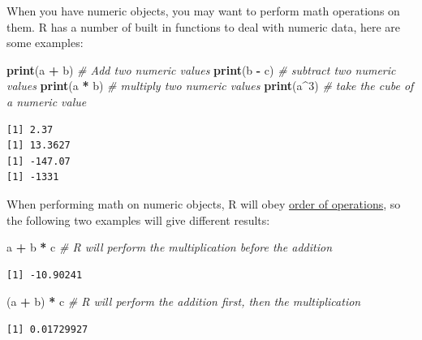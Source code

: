 \documentclass[
]{article}
\newenvironment{Shaded}{\begin{snugshade}}{\end{snugshade}}
\newcommand{\CommentTok}[1]{\textcolor[rgb]{0.56,0.35,0.01}{\textit{#1}}}
\newcommand{\DecValTok}[1]{\textcolor[rgb]{0.00,0.00,0.81}{#1}}
\newcommand{\KeywordTok}[1]{\textcolor[rgb]{0.13,0.29,0.53}{\textbf{#1}}}
\newcommand{\NormalTok}[1]{#1}
\newcommand{\OperatorTok}[1]{\textcolor[rgb]{0.81,0.36,0.00}{\textbf{#1}}}
\newcommand{\StringTok}[1]{\textcolor[rgb]{0.31,0.60,0.02}{#1}}
\begin{document}
When you have numeric objects, you may want to perform math operations on them.
R has a number of built in functions to deal with numeric data, here are some examples:

\begin{Shaded}
\begin{Highlighting}[]
\KeywordTok{print}\NormalTok{(a }\OperatorTok{+}\StringTok{ }\NormalTok{b)  }\CommentTok{# Add two numeric values}
\KeywordTok{print}\NormalTok{(b }\OperatorTok{-}\StringTok{ }\NormalTok{c)  }\CommentTok{# subtract two numeric values }
\KeywordTok{print}\NormalTok{(a }\OperatorTok{*}\StringTok{ }\NormalTok{b)  }\CommentTok{# multiply two numeric values}
\KeywordTok{print}\NormalTok{(a}\OperatorTok{^}\DecValTok{3}\NormalTok{)    }\CommentTok{# take the cube of a numeric value}
\end{Highlighting}
\end{Shaded}

\begin{verbatim}
[1] 2.37
[1] 13.3627
[1] -147.07
[1] -1331
\end{verbatim}

When performing math on numeric objects, R will obey \href{https://en.wikipedia.org/wiki/Order_of_operations}{order of operations}, so the following two examples will give different results:

\begin{Shaded}
\begin{Highlighting}[]
\NormalTok{a }\OperatorTok{+}\StringTok{ }\NormalTok{b }\OperatorTok{*}\StringTok{ }\NormalTok{c    }\CommentTok{# R will perform the multiplication before the addition}
\end{Highlighting}
\end{Shaded}

\begin{verbatim}
[1] -10.90241
\end{verbatim}

\begin{Shaded}
\begin{Highlighting}[]
\NormalTok{(a }\OperatorTok{+}\StringTok{ }\NormalTok{b) }\OperatorTok{*}\StringTok{ }\NormalTok{c  }\CommentTok{# R will perform the addition first, then the multiplication }
\end{Highlighting}
\end{Shaded}

\begin{verbatim}
[1] 0.01729927
\end{verbatim}
\end{document}
